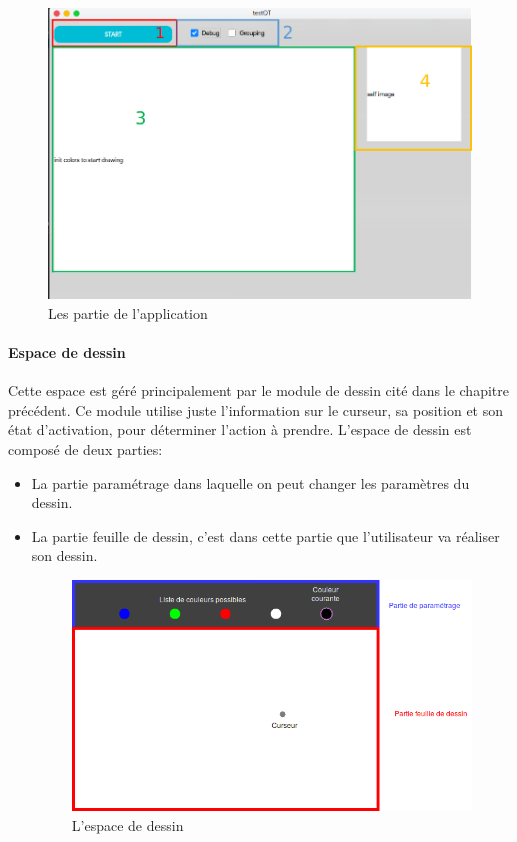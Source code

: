 \documentclass[12pt]{report}
\begin{document}
		\begin{figure}[H]
		\centering
		\includegraphics[scale=0.6]{imgs/main.png}
		\caption{Les partie de l'application}
		\label{fig:InitColors}
	\end{figure}

	\paragraph{Espace de dessin}
	Cette espace est géré principalement par le module de dessin cité dans le chapitre précédent. Ce module utilise juste l’information sur le curseur, sa position et son état d’activation, pour déterminer l’action à prendre. L’espace de dessin est composé de deux parties:
	\begin{itemize}
		\item La partie paramétrage dans laquelle on peut changer les paramètres du dessin.
		\item La partie feuille de dessin, c’est dans cette partie que l’utilisateur va réaliser son dessin.
		\begin{figure}[H]
			\centering
			\includegraphics[scale=0.75]{imgs/Drawer.png}
			\caption{L'espace de dessin}
			\label{fig:Drawer}
		\end{figure}
	\end{itemize}
	
\end{document}
